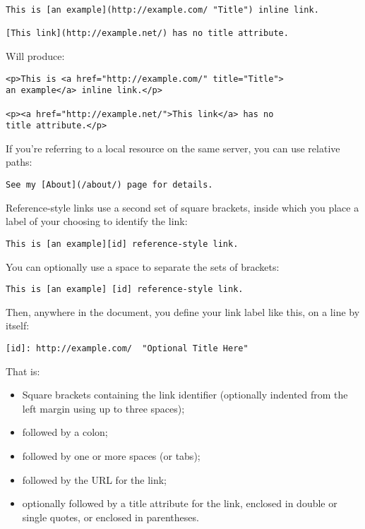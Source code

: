 \begin{verbatim}
This is [an example](http://example.com/ "Title") inline link.

[This link](http://example.net/) has no title attribute.
\end{verbatim}

Will produce:

\begin{verbatim}
<p>This is <a href="http://example.com/" title="Title">
an example</a> inline link.</p>

<p><a href="http://example.net/">This link</a> has no
title attribute.</p>
\end{verbatim}

If you're referring to a local resource on the same server, you can
use relative paths:

\begin{verbatim}
See my [About](/about/) page for details.   
\end{verbatim}

Reference-style links use a second set of square brackets, inside
which you place a label of your choosing to identify the link:

\begin{verbatim}
This is [an example][id] reference-style link.
\end{verbatim}

You can optionally use a space to separate the sets of brackets:

\begin{verbatim}
This is [an example] [id] reference-style link.
\end{verbatim}

Then, anywhere in the document, you define your link label like this,
on a line by itself:

\begin{verbatim}
[id]: http://example.com/  "Optional Title Here"
\end{verbatim}

That is:

\begin{itemize}
\item{} Square brackets containing the link identifier (optionally
indented from the left margin using up to three spaces);

\item{} followed by a colon;

\item{} followed by one or more spaces (or tabs);

\item{} followed by the URL for the link;

\item{} optionally followed by a title attribute for the link, enclosed
in double or single quotes, or enclosed in parentheses.

\end{itemize}

